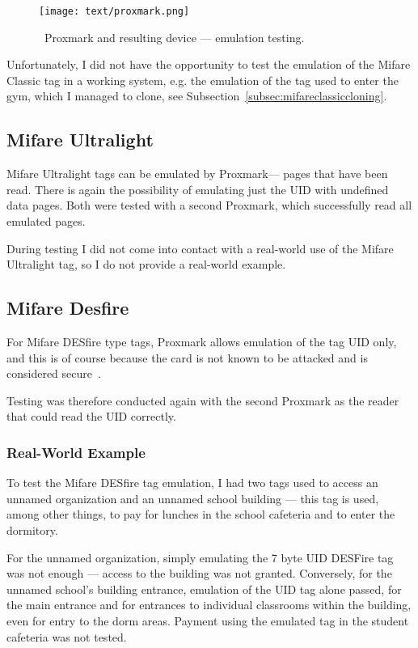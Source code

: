 \begin{figure}[ht]
  \centering
  \texttt{[image: text/proxmark.png]}
  \caption{~Proxmark and resulting device --- emulation testing.}
  \label{fig:proxmarkemulatingtesting}
\end{figure}

Unfortunately, I did not have the opportunity to test the emulation of the Mifare Classic tag in a working system, e.g. the emulation of the tag used to enter the gym, which I managed to clone, see Subsection~\ref{subsec:mifareclassiccloning}.

\subsection{Mifare Ultralight}

Mifare Ultralight tags can be emulated by Proxmark--- pages that have been read. There is again the possibility of emulating just the UID with undefined data pages. Both were tested with a second Proxmark, which successfully read all emulated pages.

During testing I did not come into contact with a real-world use of the Mifare Ultralight tag, so I do not provide a real-world example.

\subsection{Mifare Desfire}
For Mifare DESfire type tags, Proxmark allows emulation of the tag UID only, and this is of course because the card is not known to be attacked and is considered secure~\cite{preucil2023surveying}. 

Testing was therefore conducted again with the second Proxmark as the reader that could read the UID correctly.

\subsubsection{Real-World Example}
To test the Mifare DESfire tag emulation, I had two tags used to access an unnamed organization and an unnamed school building --- this tag is used, among other things, to pay for lunches in the school cafeteria and to enter the dormitory. 

For the unnamed organization, simply emulating the 7 byte UID DESFire tag was not enough --- access to the building was not granted. Conversely, for the unnamed school's building entrance, emulation of the UID tag alone passed, for the main entrance and for entrances to individual classrooms within the building, even for entry to the dorm areas. Payment using the emulated tag in the student cafeteria was not tested.

